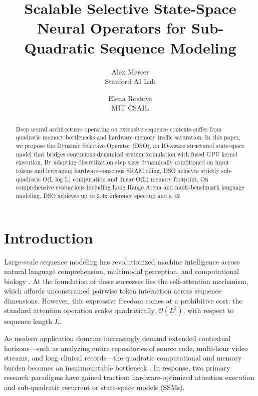 \documentclass{article}
\title{Scalable Selective State-Space Neural Operators for Sub-Quadratic Sequence Modeling}
\author{Alex Mercer\\ \small Stanford AI Lab \and Elena Rostova\\ \small MIT CSAIL}
\begin{document}
\maketitle

\begin{abstract}
Deep neural architectures operating on extensive sequence contexts suffer from quadratic memory bottlenecks and hardware memory traffic saturation. In this paper, we propose the Dynamic Selective Operator (DSO), an IO-aware structured state-space model that bridges continuous dynamical system formulation with fused GPU kernel execution. By adapting discretization step sizes dynamically conditioned on input tokens and leveraging hardware-conscious SRAM tiling, DSO achieves strictly sub-quadratic O(L log L) computation and linear O(L) memory footprint. On comprehensive evaluations including Long Range Arena and multi-benchmark language modeling, DSO achieves up to 2.4x inference speedup and a 42%
\end{abstract}

\section{Introduction}
Large-scale sequence modeling has revolutionized machine intelligence across natural language comprehension, multimodal perception, and computational biology \cite{vaswani2017attention, brown2020language}. At the foundation of these successes lies the self-attention mechanism, which affords unconstrained pairwise token interaction across sequence dimensions. However, this expressive freedom comes at a prohibitive cost: the standard attention operation scales quadratically, $\mathcal{O}(L^2)$, with respect to sequence length $L$.

As modern application domains increasingly demand extended contextual horizons—such as analyzing entire repositories of source code, multi-hour video streams, and long clinical records—the quadratic computational and memory burden becomes an insurmountable bottleneck \cite{dao2022flashattention}. In response, two primary research paradigms have gained traction: hardware-optimized attention execution and sub-quadratic recurrent or state-space models (SSMs).
\end{document}
